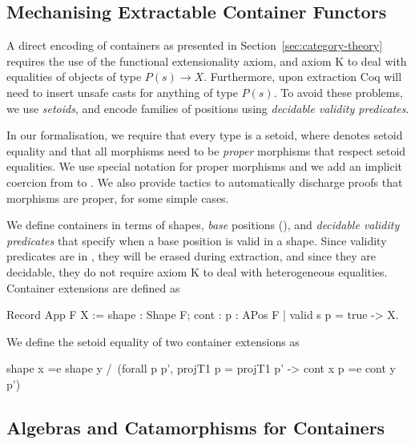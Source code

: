 \documentclass[a4paper,UKenglish,cleveref, autoref, thm-restate]{lipics-v2021}
\begin{document}
\subsection{Mechanising Extractable Container Functors}
\label{sec:containers}
A direct encoding of containers as presented in
Section~\ref{sec:category-theory} requires the use of the functional
extensionality axiom, and axiom K to deal with equalities of objects of type
$P(s) \to X$. Furthermore, upon extraction Coq will need to insert unsafe casts for
anything of type $P(s)$.  To avoid these problems, we use \emph{setoids}, and
encode families of positions using \emph{decidable validity predicates}.

In our formalisation, we require that every type is a setoid, where 
denotes setoid equality and that all morphisms need to be \emph{proper}
morphisms that respect setoid equalities. We use special notation  
for proper morphisms and we add an implicit coercion from  to
.  We also provide tactics to automatically discharge proofs that
morphisms are proper,  for some simple cases.

We define containers in terms of shapes, \emph{base} positions
(), and \emph{decidable validity predicates} that specify when a
base position is valid in a shape. Since validity predicates are in ,
they will be erased during extraction, and since they are decidable, they do not
require axiom K to deal with heterogeneous equalities.  Container extensions are
defined as
\begin{coqcode}
Record App F X := {shape : Shape F; cont : {p : APos F | valid s p = true} -> X}.
\end{coqcode}
We define the setoid equality of two container extensions  as
\begin{coqcode}
shape x =e shape y /\ (forall p p', projT1 p = projT1 p' -> cont x p =e cont y p')
\end{coqcode}


\subsection{Algebras and Catamorphisms for Containers}
\label{sec:coq-algebras}
\end{document}
